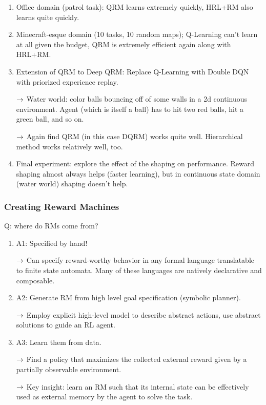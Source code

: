 \begin{enumerate}
\item Office domain (patrol task): QRM learns extremely quickly, HRL+RM also learns quite quickly.
\item Minecraft-esque domain (10 tasks, 10 random maps); Q-Learning can't learn at all given the budget, QRM is extremely efficient again along with HRL+RM.
\item Extension of QRM to Deep QRM: Replace Q-Learning with Double DQN with priorized experience replay.

$\rightarrow$ Water world: color balls bouncing off of some walls in a 2d continuous environment. Agent (which is itself a ball) has to hit two red balls, hit a green ball, and so on.

$\rightarrow$ Again find QRM (in this case DQRM) works quite well. Hierarchical method works relatively well, too.

\item Final experiment: explore the effect of the shaping on performance. Reward shaping almost always helps (faster learning), but in continuous state domain (water world) shaping doesn't help.
\end{enumerate}


\subsubsection{Creating Reward Machines}
Q: where do RMs come from?
\begin{enumerate}
\item A1: Specified by hand!

$\rightarrow$ Can specify reward-worthy behavior in any formal language translatable to finite state automata. Many of these languages are natively declarative and composable.

\item A2: Generate RM from high level goal specification (symbolic planner).

$\rightarrow$ Employ explicit high-level model to describe abstract actions, use abstract solutions to guide an RL agent.

\item A3: Learn them from data.

$\rightarrow$ Find a policy that maximizes the collected external reward given by a partially observable environment.

$\rightarrow$ Key insight: learn an RM such that its internal state can be effectively used as external memory by the agent to solve the task.

\end{enumerate}

